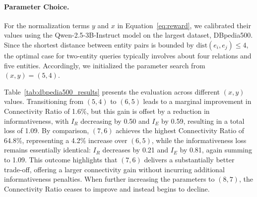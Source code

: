 \paragraph{Parameter Choice.}

\begin{table}[ht]
\centering
\renewcommand{\arraystretch}{1.2}
\caption{Evaluation results of Qwen-2.5-3B-Instruct model on DBpedia500 under different parameter settings. Only reachable cases are reported for $I_R$ and $I_E$.}
\setlength{\tabcolsep}{8pt}
\label{tab:dbpedia500_results}
\end{table}

For the normalization terms $y$ and $x$ in Equation~\ref{eq:reward}, 
we calibrated their values using the Qwen-2.5-3B-Instruct model on the largest dataset, DBpedia500. 
Since the shortest distance between entity pairs is bounded by $\mathrm{dist}(e_i,e_j) \leq 4$, 
the optimal case for two-entity queries typically involves about four relations and five entities. 
Accordingly, we initialized the parameter search from $(x,y)=(5,4)$.  

Table~\ref{tab:dbpedia500_results} presents the evaluation across different $(x,y)$ values. 
Transitioning from $(5,4)$ to $(6,5)$ leads to a marginal improvement in Connectivity Ratio of 1.6\%, 
but this gain is offset by a reduction in informativeness, with $I_R$ decreasing by 0.50 and $I_E$ by 0.59, 
resulting in a total loss of 1.09. 
By comparison, $(7,6)$ achieves the highest Connectivity Ratio of 64.8\%, representing a 4.2\% increase over $(6,5)$, 
while the informativeness loss remains essentially identical: $I_R$ decreases by 0.21 and $I_E$ by 0.81, 
again summing to 1.09. 
This outcome highlights that $(7,6)$ delivers a substantially better trade-off, 
offering a larger connectivity gain without incurring additional informativeness penalties. 
When further increasing the parameters to $(8,7)$, the Connectivity Ratio ceases to improve and instead begins to decline.  

